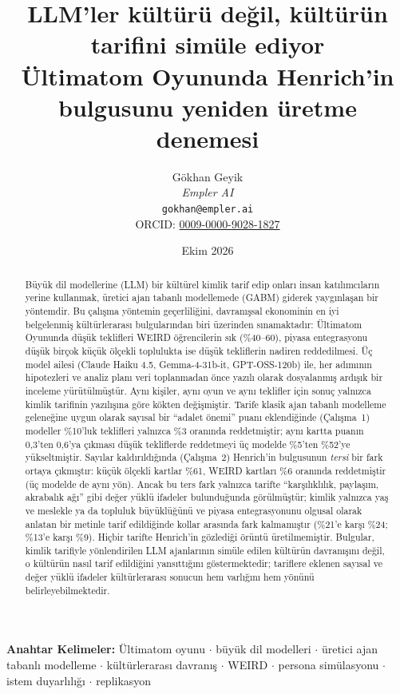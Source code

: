 \documentclass[11pt]{article}
\title{\textbf{LLM'ler kültürü değil, kültürün tarifini simüle ediyor}\\[0.3em]
\large Ültimatom Oyununda Henrich'in bulgusunu yeniden üretme denemesi}
\author{Gökhan Geyik\\\textit{Empler AI}\\\texttt{gokhan@empler.ai}\\ORCID: \href{https://orcid.org/0009-0000-9028-1827}{0009-0000-9028-1827}}
\date{Ekim 2026}
\begin{document}
\renewcommand{\abstractname}{Öz}
\renewcommand{\refname}{Kaynakça}
\renewcommand{\figurename}{Şekil}
\renewcommand{\tablename}{Tablo}

\maketitle

\textbf{Anahtar Kelimeler:} Ültimatom oyunu $\cdot$ büyük dil modelleri $\cdot$ üretici ajan tabanlı modelleme $\cdot$ kültürlerarası davranış $\cdot$ WEIRD $\cdot$ persona simülasyonu $\cdot$ istem duyarlılığı $\cdot$ replikasyon

\begin{abstract}
\noindent
Büyük dil modellerine (LLM) bir kültürel kimlik tarif edip onları insan katılımcıların yerine kullanmak, üretici ajan tabanlı modellemede (GABM) giderek yaygınlaşan bir yöntemdir. Bu çalışma yöntemin geçerliliğini, davranışsal ekonominin en iyi belgelenmiş kültürlerarası bulgularından biri üzerinden sınamaktadır: Ültimatom Oyununda düşük teklifleri WEIRD öğrencilerin sık (\%40--60), piyasa entegrasyonu düşük birçok küçük ölçekli toplulukta ise düşük tekliflerin nadiren reddedilmesi. Üç model ailesi (Claude Haiku 4.5, Gemma-4-31b-it, GPT-OSS-120b) ile, her adımının hipotezleri ve analiz planı veri toplanmadan önce yazılı olarak dosyalanmış ardışık bir inceleme yürütülmüştür. Aynı kişiler, aynı oyun ve aynı teklifler için sonuç yalnızca kimlik tarifinin yazılışına göre kökten değişmiştir. Tarife klasik ajan tabanlı modelleme geleneğine uygun olarak sayısal bir ``adalet önemi'' puanı eklendiğinde (Çalışma~1) modeller \%10'luk teklifleri yalnızca \%3 oranında reddetmiştir; aynı kartta puanın 0,3'ten 0,6'ya çıkması düşük tekliflerde reddetmeyi üç modelde \%5'ten \%52'ye yükseltmiştir. Sayılar kaldırıldığında (Çalışma~2) Henrich'in bulgusunun \emph{tersi} bir fark ortaya çıkmıştır: küçük ölçekli kartlar \%61, WEIRD kartları \%6 oranında reddetmiştir (üç modelde de aynı yön). Ancak bu ters fark yalnızca tarifte ``karşılıklılık, paylaşım, akrabalık ağı'' gibi değer yüklü ifadeler bulunduğunda görülmüştür; kimlik yalnızca yaş ve meslekle ya da topluluk büyüklüğünü ve piyasa entegrasyonunu olgusal olarak anlatan bir metinle tarif edildiğinde kollar arasında fark kalmamıştır (\%21'e karşı \%24; \%13'e karşı \%9). Hiçbir tarifte Henrich'in gözlediği örüntü üretilmemiştir. Bulgular, kimlik tarifiyle yönlendirilen LLM ajanlarının simüle edilen kültürün davranışını değil, o kültürün nasıl tarif edildiğini yansıttığını göstermektedir; tariflere eklenen sayısal ve değer yüklü ifadeler kültürlerarası sonucun hem varlığını hem yönünü belirleyebilmektedir.
\end{abstract}
\end{document}
